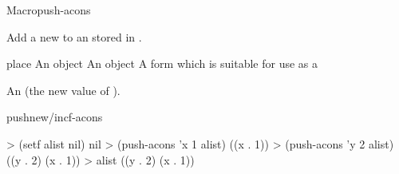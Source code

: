 \documentclass[10pt,twoside,english,pdftex]{article}
\begin{document}
\begin{functiondoc}{Macro}{push-acons}{
    \returns{} } 
%
%
  
\fnsyntax

\fnpurpose Add a new   to an
 stored in .

\fnpackage {}

\fnmodule {}

\fnargs
\begin{args}{place}
\arg[item] An object
\arg[value] An object
\arg[place] A form which is suitable for use as a
\end{args}

\fnreturns An  (the new value of
). 

\begin{alsos}{pushnew/incf-acons}
\end{alsos}

\fnexamples
%
\W\supp
\begin{example}
> (setf alist nil)
nil
> (push-acons 'x 1 alist)
((x . 1))\goodpagebreak
> (push-acons 'y 2 alist)
((y . 2) (x . 1))
> alist
((y . 2) (x . 1))
\end{example}

\end{functiondoc}

\end{document}
